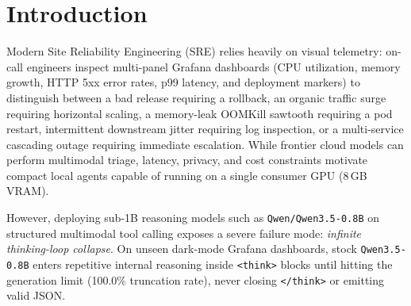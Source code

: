 \documentclass[10pt,letterpaper]{article}
\begin{document}
\section{Introduction}
Modern Site Reliability Engineering (SRE) relies heavily on visual telemetry: on-call engineers inspect multi-panel Grafana dashboards (CPU utilization, memory growth, HTTP 5xx error rates, p99 latency, and deployment markers) to distinguish between a bad release requiring a rollback, an organic traffic surge requiring horizontal scaling, a memory-leak OOMKill sawtooth requiring a pod restart, intermittent downstream jitter requiring log inspection, or a multi-service cascading outage requiring immediate escalation. While frontier cloud models can perform multimodal triage, latency, privacy, and cost constraints motivate compact local agents capable of running on a single consumer GPU (8\,GB VRAM).

However, deploying sub-1B reasoning models such as \texttt{Qwen/Qwen3.5-0.8B} \cite{qwen35} on structured multimodal tool calling exposes a severe failure mode: \textit{infinite thinking-loop collapse}. On unseen dark-mode Grafana dashboards, stock \texttt{Qwen3.5-0.8B} enters repetitive internal reasoning inside \texttt{<think>} blocks until hitting the generation limit (100.0\% truncation rate), never closing \texttt{</think>} or emitting valid JSON.
\end{document}
